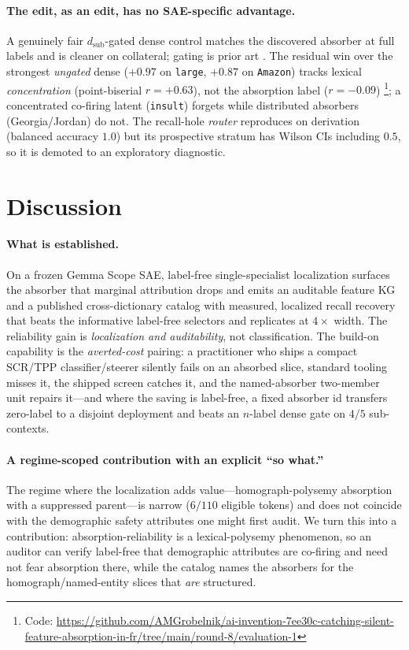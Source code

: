 \documentclass[11pt,letterpaper]{article}
\begin{document}
\paragraph{The edit, as an edit, has no SAE-specific advantage.} A genuinely fair $d_{\text{sub}}$-gated dense control matches the discovered absorber at full labels and is cleaner on collateral; gating is prior art \citep{Lee2024, Zhang2026, Turani2026, Wang2024}. The residual win over the strongest \emph{ungated} dense ($+0.97$ on \texttt{large}, $+0.87$ on \texttt{Amazon}) tracks lexical \emph{concentration} (point-biserial $r{=}{+}0.63$), not the absorption label ($r{=}{-}0.09$) \footnote{Code: \url{https://github.com/AMGrobelnik/ai-invention-7ee30c-catching-silent-feature-absorption-in-fr/tree/main/round-8/evaluation-1}}; a concentrated co-firing latent (\texttt{insult}) forgets while distributed absorbers (Georgia/Jordan) do not. The recall-hole \emph{router} reproduces on derivation (balanced accuracy $1.0$) but its prospective stratum has Wilson CIs including $0.5$, so it is demoted to an exploratory diagnostic.

\section{Discussion}
\label{sec:discussion}

\paragraph{What is established.} On a frozen Gemma Scope SAE, label-free single-specialist localization surfaces the absorber that marginal attribution drops and emits an auditable feature KG and a published cross-dictionary catalog with measured, localized recall recovery that beats the informative label-free selectors and replicates at $4\times$ width. The reliability gain is \emph{localization and auditability}, not classification. The build-on capability is the \emph{averted-cost} pairing: a practitioner who ships a compact SCR/TPP classifier/steerer silently fails on an absorbed slice, standard tooling misses it, the shipped screen catches it, and the named-absorber two-member unit repairs it---and where the saving is label-free, a fixed absorber id transfers zero-label to a disjoint deployment and beats an $n$-label dense gate on $4/5$ sub-contexts.

\paragraph{A regime-scoped contribution with an explicit ``so what.''} The regime where the localization adds value---homograph-polysemy absorption with a suppressed parent---is narrow ($6/110$ eligible tokens) and does not coincide with the demographic safety attributes one might first audit. We turn this into a contribution: absorption-reliability is a lexical-polysemy phenomenon, so an auditor can verify label-free that demographic attributes are co-firing and need not fear absorption there, while the catalog names the absorbers for the homograph/named-entity slices that \emph{are} structured.
\end{document}

